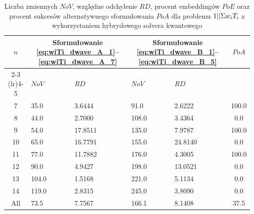 \begin{table}[!ht]
\renewcommand{\arraystretch}{1.5}
\caption{Liczba zmiennych $\mathit{NoV}$, względne odchylenie $\mathit{RD}$, procent embeddingów $\mathit{PoE}$ oraz procent sukcesów alternatywnego sformułowania $\mathit{PoA}$ dla problemu $1||\Sigma{}w_i T_i$  z wykorzystaniem hybrydowego solvera kwantowego}\label{tab:hybrid_wiTi}
\begin{tabularx}{\columnwidth}{c*{4}{X}c}
\toprule
\multirow{2}{*}{$n$} & \multicolumn{2}{c}{\scriptsize Sformułowanie  \eqref{eq:wiTi_dwave_A_1}--\eqref{eq:wiTi_dwave_A_7}} & \multicolumn{2}{c}{\scriptsize Sformułowanie  \eqref{eq:wiTi_dwave_B_1}--\eqref{eq:wiTi_dwave_B_5}} & \multirow{2}{*}{$\mathit{PoA}$} \\ \cmidrule(r){2-3} \cmidrule(lr){4-5}
& $\mathit{NoV}$ & $\mathit{RD}$  & $\mathit{NoV}$ & $\mathit{RD}$ & \\ \midrule
\phantom{0}7 & \phantom{0}35.0 & \phantom{0}3.6444 & \phantom{0}91.0 & \phantom{0}2.6222 & 100.0 \\
\phantom{0}8 & \phantom{0}44.0 & \phantom{0}2.7000 & 108.0 & \phantom{0}3.4364 & \phantom{00}0.0 \\
\phantom{0}9 & \phantom{0}54.0 & 17.8511 & 135.0 & \phantom{0}7.9787 & 100.0 \\
10 & \phantom{0}65.0 & 16.7791 & 155.0 & 24.8140 & \phantom{00}0.0 \\
11 & \phantom{0}77.0 & 11.7882 & 176.0 & \phantom{0}4.3005 & 100.0 \\
12 & \phantom{0}90.0 & \phantom{0}4.9427 & 198.0 & 13.0521 & \phantom{00}0.0 \\
13 & 104.0 & \phantom{0}1.5168 & 221.0 & \phantom{0}5.1134 & \phantom{00}0.0 \\
14 & 119.0 & \phantom{0}2.8315 & 245.0 & \phantom{0}3.8090 & \phantom{00}0.0 \\ \midrule
All & \phantom{0}73.5 & \phantom{0}7.7567 & 166.1 & \phantom{0}8.1408 & \phantom{0}37.5 \\
\bottomrule
\end{tabularx}
\renewcommand{\arraystretch}{1.0}
\end{table}

